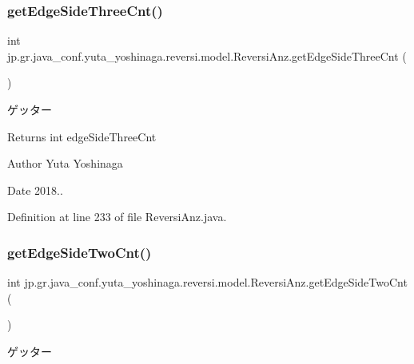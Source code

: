 \subsubsection{\texorpdfstring{get\+Edge\+Side\+Three\+Cnt()}{getEdgeSideThreeCnt()}}
{\footnotesize\ttfamily int jp.\+gr.\+java\+\_\+conf.\+yuta\+\_\+yoshinaga.\+reversi.\+model.\+Reversi\+Anz.\+get\+Edge\+Side\+Three\+Cnt (\begin{DoxyParamCaption}{ }\end{DoxyParamCaption})}



ゲッター 

\begin{DoxyReturn}{Returns}
int edge\+Side\+Three\+Cnt 
\end{DoxyReturn}
\begin{DoxyAuthor}{Author}
Yuta Yoshinaga 
\end{DoxyAuthor}
\begin{DoxyDate}{Date}
2018.. 
\end{DoxyDate}


Definition at line 233 of file Reversi\+Anz.\+java.

\mbox{\label{classjp_1_1gr_1_1java__conf_1_1yuta__yoshinaga_1_1reversi_1_1model_1_1_reversi_anz_a8dfaff66ad4ffa6fc17686b444640133}} 
\subsubsection{\texorpdfstring{get\+Edge\+Side\+Two\+Cnt()}{getEdgeSideTwoCnt()}}
{\footnotesize\ttfamily int jp.\+gr.\+java\+\_\+conf.\+yuta\+\_\+yoshinaga.\+reversi.\+model.\+Reversi\+Anz.\+get\+Edge\+Side\+Two\+Cnt (\begin{DoxyParamCaption}{ }\end{DoxyParamCaption})}



ゲッター 

